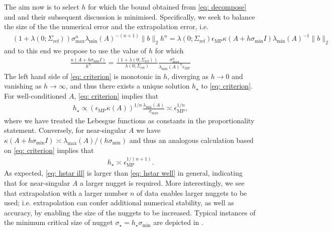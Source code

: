 \documentclass[10pt]{article} %
\newcommand{\nugget}{\sigma}
\newcommand{\nuggets}{\Sigma}
\begin{document}
The aim now is to select $h$ for which the bound obtained from \eqref{eq: decompose} and  and their subsequent discussion is minimised.
Specifically, we seek to balance the size of the the numerical error and the extrapolation error, i.e.
\begin{align*}
&( 1 + \lambda(0; \nuggets_{\mathrm{ref}}) ) \nugget_{\max}^n \lambda_{\min}(A)^{-(n+1)} \|b\|_2    h^n =  \lambda(0; \nuggets_{\mathrm{ref}}) \epsilon_{\mathrm{MP}} \kappa(A + h \nugget_{\min} I )  \lambda_{\min}(A)^{-1} \|b\|_2
\end{align*}
and to this end we propose to use the value of $h$ for which
\begin{align}
\frac{ \kappa( A + h \nugget_{\min} I  ) }{ h^n }  
= 
\frac{ ( 1 + \lambda(0; \nuggets_{\mathrm{ref}}) ) }{ \lambda(0; \nuggets_{\mathrm{ref}}) } \frac{ \nugget_{\max}^n  }{ \lambda_{\min}(A)^n \epsilon_{\mathrm{MP}}  }    \label{eq: criterion}
\end{align}
The left hand side of \eqref{eq: criterion} is monotonic in $h$, diverging as $h \rightarrow 0$ and vanishing as $h \rightarrow \infty$, and thus there exists a unique solution $h_\star$ to \eqref{eq: criterion}.
For well-conditioned $A$, \eqref{eq: criterion} implies that
\begin{align}
h_\star  \propto ( \epsilon_{\mathrm{MP}} \kappa(A) )^{1/n} \frac{ \lambda_{\min}(A) }{ \nugget_{\max} } \asymp  \epsilon_{\mathrm{MP}}^{1/n} , \label{eq: hstar well}
\end{align}
where we have treated the Lebesgue functions as constants in the proportionality statement.
Conversely, for near-singular $A$ we have $\kappa(A + h \nugget_{\min} I) \asymp \lambda_{\max}(A) / ( h \nugget_{\min} )$ and thus an analogous calculation based on \eqref{eq: criterion} implies that
\begin{align}
h_\star \asymp \epsilon_{\mathrm{MP}}^{1/(n+1)}   . \label{eq: hstar ill}
\end{align}
As expected, \eqref{eq: hstar ill} is larger than \eqref{eq: hstar well} in general, indicating that for near-singular $A$ a larger nugget is required.
More interestingly, we see that extrapolation with a larger number $n$ of data enables larger nuggets to be used; i.e. extrapolation can confer additional numerical stability, as well as accuracy, by enabling the size of the nuggets to be increased.
Typical instances of the minimum critical size of nugget $\nugget_\star = h_\star \nugget_{\min}$ are depicted in .
\end{document}
